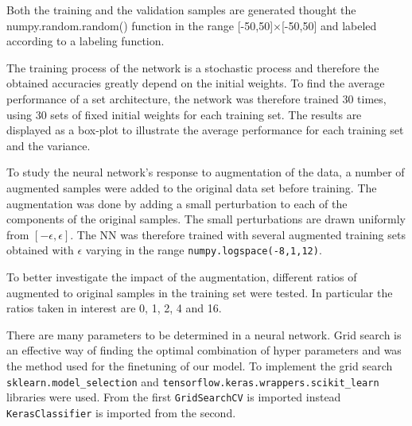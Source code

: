 \documentclass[prl,twocolumn]{revtex4-1}
\begin{document}
Both the training and the validation samples are generated thought the numpy.random.random() function in the range [-50,50]$\times$[-50,50] and labeled according to a labeling function.



The training process of the network is a stochastic process and therefore the obtained accuracies greatly depend on the initial weights. To find the average performance of a set architecture, the network was therefore trained 30 times, using 30 sets of fixed initial weights for each training set. The results are displayed as a box-plot to illustrate the average performance for each training set and the variance. %

To study the neural network's response to augmentation of the data, a number of augmented samples were added to the original data set before training. The augmentation was done by adding a small perturbation to each of the components of the original samples. The small perturbations are drawn uniformly from $[-\epsilon, \epsilon]$.
The NN was therefore trained with several augmented training sets obtained with $\epsilon$ varying in the range \texttt{numpy.logspace(-8,1,12)}.

To better investigate the impact of the augmentation, different ratios of augmented to original samples in the training set were tested. In particular the ratios taken in interest are 0, 1, 2, 4 and 16.



There are many parameters to be determined in a neural network. Grid search is an effective way of finding the optimal combination of hyper parameters and was the method used for the finetuning of our model. To implement the grid search \texttt{sklearn.model\_selection} and \texttt{tensorflow.keras.wrappers.scikit\_learn} libraries were used. From the first \texttt{GridSearchCV} is imported instead  \texttt{KerasClassifier} is imported from the second.
\end{document}
